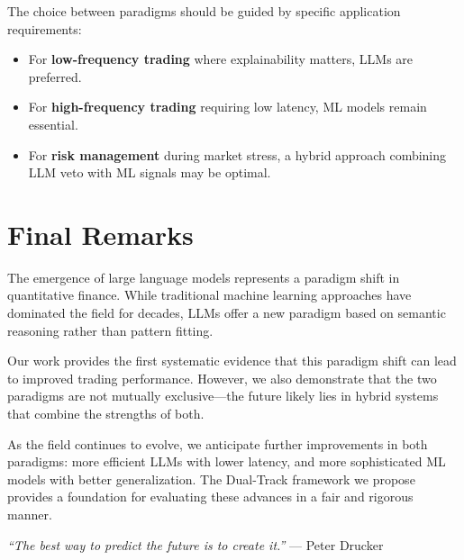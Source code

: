 The choice between paradigms should be guided by specific application requirements:

\begin{itemize}
    \item For \textbf{low-frequency trading} where explainability matters, LLMs are preferred.
    \item For \textbf{high-frequency trading} requiring low latency, ML models remain essential.
    \item For \textbf{risk management} during market stress, a hybrid approach combining LLM veto with ML signals may be optimal.
\end{itemize}

\section{Final Remarks}

The emergence of large language models represents a paradigm shift in quantitative finance. While traditional machine learning approaches have dominated the field for decades, LLMs offer a new paradigm based on semantic reasoning rather than pattern fitting.

Our work provides the first systematic evidence that this paradigm shift can lead to improved trading performance. However, we also demonstrate that the two paradigms are not mutually exclusive---the future likely lies in hybrid systems that combine the strengths of both.

As the field continues to evolve, we anticipate further improvements in both paradigms: more efficient LLMs with lower latency, and more sophisticated ML models with better generalization. The Dual-Track framework we propose provides a foundation for evaluating these advances in a fair and rigorous manner.

\vspace{2em}

\noindent\textit{``The best way to predict the future is to create it.''} --- Peter Drucker
